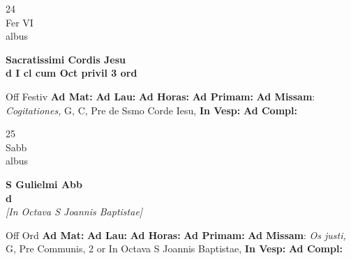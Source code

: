 \documentclass[10pt, openany]{book}
\begin{document}
        \begin{center}
            \begin{minipage}{3.5in}
                \vspace{2em}
                \begin{minipage}{0.5in}
                    {\Huge 24} \\
                    {\normalsize Fer VI} \\
                    {\normalsize albus}
                \end{minipage}
                \begin{minipage}{3.0in}
                    \textbf{ \large Sacratissimi Cordis Jesu \\
                    \textnormal{\normalsize d I cl cum Oct privil 3 ord}} \\ 
                \end{minipage}
                \begin{justify}Off Festiv
                    \textbf{Ad Mat: }
                    \textbf{Ad Lau: }
                    \textbf{Ad Horas: }
                    \textbf{Ad Primam: }\textbf{Ad Missam}: \textit{Cogitationes,} G, C, Pre de Ssmo Corde Iesu,  
                    \textbf{In Vesp: }
                    \textbf{Ad Compl: }
                \end{justify}
            \end{minipage}
        \end{center}
    
        \begin{center}
            \begin{minipage}{3.5in}
                \vspace{2em}
                \begin{minipage}{0.5in}
                    {\Huge 25} \\
                    {\normalsize Sabb} \\
                    {\normalsize albus}
                \end{minipage}
                \begin{minipage}{3.0in}
                    \textbf{ \large S Gulielmi Abb \\
                    \textnormal{\normalsize d}} \\ \textit{[In Octava S Joannis Baptistae]} \\ 
                \end{minipage}
                \begin{justify}Off Ord
                    \textbf{Ad Mat: }
                    \textbf{Ad Lau: }
                    \textbf{Ad Horas: }
                    \textbf{Ad Primam: }\textbf{Ad Missam}: \textit{Os justi,} G, Pre Communis, 2 or In Octava S Joannis Baptistae,  
                    \textbf{In Vesp: }
                    \textbf{Ad Compl: }
                \end{justify}
            \end{minipage}
        \end{center}
    
\end{document}
